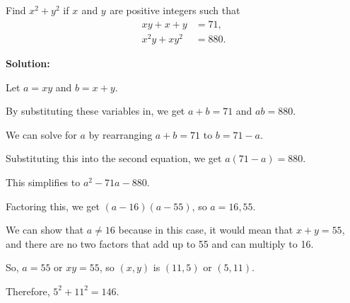 \documentclass[../mathproblems.tex]{subfiles}
\begin{document}
Find $x^2+y^2_{}$ if $x_{}^{}$ and $y_{}^{}$ are positive integers such that \begin{align*} xy+x+y&=71, \\ x^2y+xy^2&=880. \end{align*}

\textbf{Solution:}

Let $a=xy$ and $b=x+y$.

By substituting these variables in, we get $a+b=71$ and $ab = 880$.

We can solve for $a$ by rearranging $a+b = 71$ to $b=71-a$.

Substituting this into the second equation, we get $a(71-a)=880$.

This simplifies to $a^2-71a-880$.

Factoring this, we get $(a-16)(a-55)$, so $a=16,55$.

We can show that $a\neq 16$ because in this case, it would mean that $x+y=55$, and there are no two factors that add up to 55 and can multiply to 16.

So, $a=55$ or $xy=55$, so $(x,y)$ is $(11,5)$ or $(5,11)$.

Therefore, $5^2+11^2=\boxed{146}$.

\noindent\hrulefill
\end{document}

